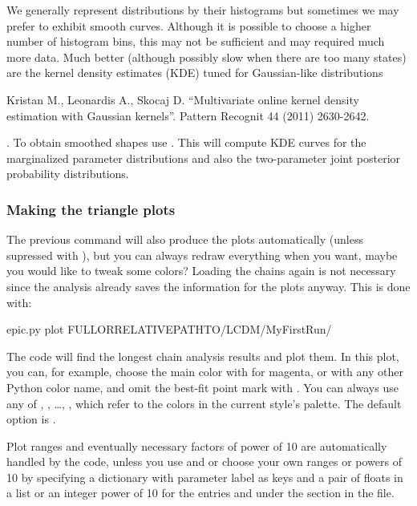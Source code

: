 \documentclass[letterpaper,12pt,english]{sphinxhowto}
\begin{document}
We generally represent distributions by their histograms but sometimes we may
prefer to exhibit smooth curves. Although it is possible to choose a higher
number of histogram bins, this may not be sufficient and may required much more
data.
Much better (although possibly slow when there are too many states) are the
kernel density estimates (KDE) tuned for Gaussian-like distributions %
\begin{footnote}[6]\sphinxAtStartFootnote
Kristan M., Leonardis A., Skocaj D. “Multivariate online kernel density estimation with Gaussian kernels”. Pattern Recognit 44 (2011) 2630-2642.
%
\end{footnote}.
To obtain smoothed shapes use . This will compute KDE curves
for the marginalized parameter distributions and also the two-parameter joint
posterior probability distributions.


\subsubsection{Making the triangle plots}
\label{\detokenize{MCMC:making-the-triangle-plots}}
The previous command will also produce the plots automatically (unless
supressed with ), but you can always redraw everything when you
want, maybe you would like to tweak some colors? Loading the chains again is
not necessary since the analysis already saves the information for the plots
anyway.
This is done with:

%
\begin{sphinxVerbatim}[commandchars=\\\{\}]
\PYGZdl{} epic.py plot \PYGZlt{}FULL\PYGZhy{}OR\PYGZhy{}RELATIVE\PYGZhy{}PATH\PYGZhy{}TO\PYGZgt{}/LCDM/MyFirstRun/
\end{sphinxVerbatim}

The code will find the longest chain analysis results and plot them.
In this plot, you can, for example, choose the main color with 
for magenta, or with any other Python color name, and omit the best-fit point mark
with .
You can always use any of , , …, , which refer to the
colors in the current style’s palette.
The default option is .

Plot ranges and eventually necessary factors of power of 10 are automatically
handled by the code, unless you use  and 
or choose your own ranges or powers of 10 by specifying a dictionary with
parameter label as keys and a pair of floats in a list or an integer power of
10 for the entries  and  under the section
 in the  file.
\end{document}

